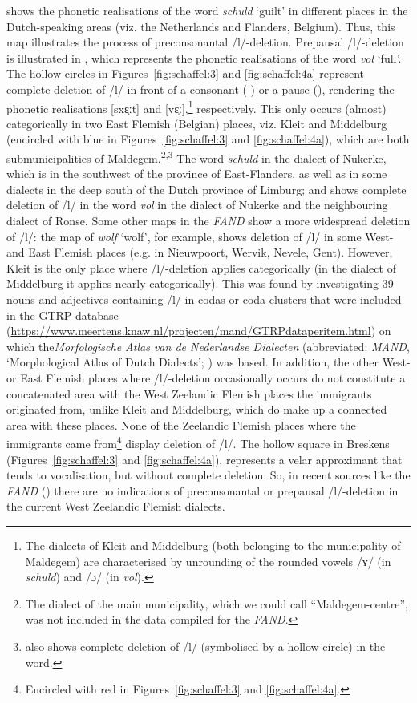 \documentclass[output=paper,hidelinks,draftmode]{langscibook}
\begin{document}
 shows the phonetic realisations of the word \textit{schuld} ‘guilt’ in different places in the Dutch-speaking areas (viz. the Netherlands and Flanders, Belgium). Thus, this map illustrates the process of preconsonantal /l/-deletion. Prepausal /l/-deletion is illustrated in , which represents the phonetic realisations of the word \textit{vol} ‘full’. The hollow circles in Figures~\ref{fig:schaffel:3} and \ref{fig:schaffel:4a} represent complete deletion of /l/ in front of a consonant ( ) or a pause (), rendering the phonetic realisations [sxɛ̝ːt] and [vɛ̝ː],\footnote{The dialects of Kleit and Middelburg (both belonging to the municipality of Maldegem) are characterised by unrounding of the rounded vowels /ʏ/ (in \textit{schuld}) and /ɔ/ (in \textit{vol}).} respectively. This only occurs (almost) categorically in two East Flemish (Belgian) places, viz. Kleit and Middelburg (encircled with blue in Figures~\ref{fig:schaffel:3} and \ref{fig:schaffel:4a}), which are both submunicipalities of Maldegem.\footnote{The dialect of the main municipality, which we could call ``Maldegem-centre'', was not included in the data compiled for the \textit{FAND}.}\textsuperscript{,}\footnote{ also shows complete deletion of /l/ (symbolised by a hollow circle) in the word.} The word \textit{schuld} in the dialect of Nukerke, which is in the southwest of the province of East-Flanders, as well as in some dialects in the deep south of the Dutch province of Limburg; and  shows complete deletion of /l/ in the word \textit{vol} in the dialect of Nukerke and the neighbouring dialect of Ronse. Some other maps in the {\textit{FAND}} {show a more widespread deletion of /l/: the map of} \textit{wolf} ‘wolf’, for example, shows deletion of /l/ in some West- and East Flemish places (e.g. in Nieuwpoort, Wervik, Nevele, Gent). However, Kleit is the only place where /l/-deletion applies categorically (in the dialect of Middelburg it applies nearly categorically). This was found by investigating 39 nouns and adjectives containing /l/ in codas or coda clusters that were included in the GTRP-database (\url{https://www.meertens.knaw.nl/projecten/mand/GTRPdataperitem.html}) on which the\textit{Morfologische Atlas van de Nederlandse Dialecten} (abbreviated: \textit{MAND}, ‘Morphological Atlas of Dutch Dialects’; \citealt{DeSchutterJong2005}) was based. In addition, the other West- or East Flemish places where /l/-deletion occasionally occurs do not constitute a concatenated area with the West Zeelandic Flemish places the immigrants originated from, unlike Kleit and Middelburg, which do make up a connected area with these places. None of the Zeelandic Flemish places where the immigrants came from\footnote{Encircled with red in Figures~\ref{fig:schaffel:3} and \ref{fig:schaffel:4a}.} display deletion of /l/. The hollow square in Breskens (Figures~\ref{fig:schaffel:3} and \ref{fig:schaffel:4a}), represents a velar approximant that tends to vocalisation, but without complete deletion. So, in recent sources like the \textit{FAND} (\citeyear{DeWulfTaeldeman2005}) there are no indications of preconsonantal or prepausal /l/-deletion in the current West Zeelandic Flemish dialects.
\end{document}
